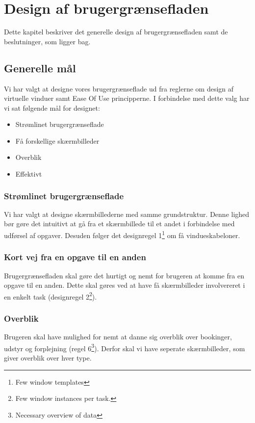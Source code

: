 \chapter{Design af brugergrænsefladen}
\label{Design_G}
Dette kapitel beskriver det generelle design af brugergrænsefladen samt de beslutninger, som ligger bag.

\section{Generelle mål}
\label{Design_G_Goals}
Vi har valgt at designe vores brugergrænseflade ud fra reglerne om design af virtuelle vinduer\cite[s. 169]{SL_UID} samt Ease Of Use principperne\cite[s. 9]{SL_UID}. I forbindelse med dette valg har vi sat følgende mål for designet:
\begin{itemize}
\item Strømlinet brugergrænseflade
\item Få forskellige skærmbilleder
\item Overblik
\item Effektivt
\end{itemize}

\subsection{Strømlinet brugergrænseflade}
Vi har valgt at designe skærmbillederne med samme grundstruktur. Denne lighed bør gøre det intuitivt at gå fra et skærmbillede til et andet i forbindelse med udførsel af opgaver. Desuden følger det designregel 1\footnote{Few window templates} om få vindueskabeloner.

\subsection{Kort vej fra en opgave til en anden}
Brugergrænsefladen skal gøre det hurtigt og nemt for brugeren at komme fra en opgave til en anden. Dette skal gøres ved at have få skærmbilleder involvereret i en enkelt task (designregel 2\footnote{Few window instances per task.}).

\subsection{Overblik}
Brugeren skal have mulighed for nemt at danne sig overblik over bookinger, udstyr og forplejning (regel 6\footnote{Necessary overview of data}). Derfor skal vi have seperate skærmbilleder, som giver overblik over hver type.

